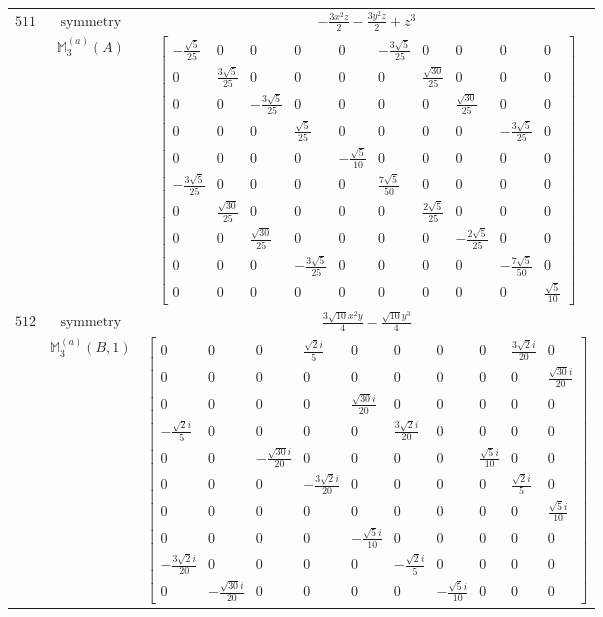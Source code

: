 \documentclass[fleqn,8pt,landscape]{jsarticle}
\begin{document}
\begin{longtable}{ccc}
$ 511 $ & $ \text{symmetry} $ & $ - \frac{3 x^{2} z}{2} - \frac{3 y^{2} z}{2} + z^{3} $ \\
$  $ & $ \mathbb{M}_{3}^{(a)}(A) $ & $ \begin{bmatrix} - \frac{\sqrt{5}}{25} & 0 & 0 & 0 & 0 & - \frac{3 \sqrt{5}}{25} & 0 & 0 & 0 & 0 \\ 0 & \frac{3 \sqrt{5}}{25} & 0 & 0 & 0 & 0 & \frac{\sqrt{30}}{25} & 0 & 0 & 0 \\ 0 & 0 & - \frac{3 \sqrt{5}}{25} & 0 & 0 & 0 & 0 & \frac{\sqrt{30}}{25} & 0 & 0 \\ 0 & 0 & 0 & \frac{\sqrt{5}}{25} & 0 & 0 & 0 & 0 & - \frac{3 \sqrt{5}}{25} & 0 \\ 0 & 0 & 0 & 0 & - \frac{\sqrt{5}}{10} & 0 & 0 & 0 & 0 & 0 \\ - \frac{3 \sqrt{5}}{25} & 0 & 0 & 0 & 0 & \frac{7 \sqrt{5}}{50} & 0 & 0 & 0 & 0 \\ 0 & \frac{\sqrt{30}}{25} & 0 & 0 & 0 & 0 & \frac{2 \sqrt{5}}{25} & 0 & 0 & 0 \\ 0 & 0 & \frac{\sqrt{30}}{25} & 0 & 0 & 0 & 0 & - \frac{2 \sqrt{5}}{25} & 0 & 0 \\ 0 & 0 & 0 & - \frac{3 \sqrt{5}}{25} & 0 & 0 & 0 & 0 & - \frac{7 \sqrt{5}}{50} & 0 \\ 0 & 0 & 0 & 0 & 0 & 0 & 0 & 0 & 0 & \frac{\sqrt{5}}{10} \end{bmatrix} $ \\ \hline
$ 512 $ & $ \text{symmetry} $ & $ \frac{3 \sqrt{10} x^{2} y}{4} - \frac{\sqrt{10} y^{3}}{4} $ \\
$  $ & $ \mathbb{M}_{3}^{(a)}(B,1) $ & $ \begin{bmatrix} 0 & 0 & 0 & \frac{\sqrt{2} i}{5} & 0 & 0 & 0 & 0 & \frac{3 \sqrt{2} i}{20} & 0 \\ 0 & 0 & 0 & 0 & 0 & 0 & 0 & 0 & 0 & \frac{\sqrt{30} i}{20} \\ 0 & 0 & 0 & 0 & \frac{\sqrt{30} i}{20} & 0 & 0 & 0 & 0 & 0 \\ - \frac{\sqrt{2} i}{5} & 0 & 0 & 0 & 0 & \frac{3 \sqrt{2} i}{20} & 0 & 0 & 0 & 0 \\ 0 & 0 & - \frac{\sqrt{30} i}{20} & 0 & 0 & 0 & 0 & \frac{\sqrt{5} i}{10} & 0 & 0 \\ 0 & 0 & 0 & - \frac{3 \sqrt{2} i}{20} & 0 & 0 & 0 & 0 & \frac{\sqrt{2} i}{5} & 0 \\ 0 & 0 & 0 & 0 & 0 & 0 & 0 & 0 & 0 & \frac{\sqrt{5} i}{10} \\ 0 & 0 & 0 & 0 & - \frac{\sqrt{5} i}{10} & 0 & 0 & 0 & 0 & 0 \\ - \frac{3 \sqrt{2} i}{20} & 0 & 0 & 0 & 0 & - \frac{\sqrt{2} i}{5} & 0 & 0 & 0 & 0 \\ 0 & - \frac{\sqrt{30} i}{20} & 0 & 0 & 0 & 0 & - \frac{\sqrt{5} i}{10} & 0 & 0 & 0 \end{bmatrix} $ \\ \hline

\end{longtable}
\end{document}
